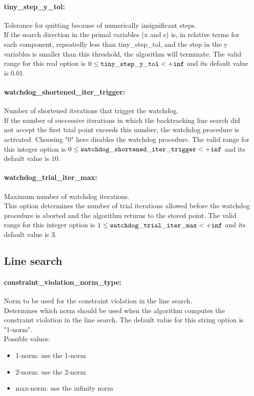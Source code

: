 \paragraph{tiny\_step\_y\_tol:}\label{sec:tiny_step_y_tol} Tolerance for quitting because of numerically insignificant steps. $\;$ \\
 If the search direction in the primal variables
(x and s) is, in relative terms for each
component, repeatedly less than tiny\_step\_tol,
and the step in the y variables is smaller than
this threshold, the algorithm will terminate. The valid range for this real option is 
$0 \le {\tt tiny\_step\_y\_tol } <  {\tt +inf}$
and its default value is $0.01$.


\paragraph{watchdog\_shortened\_iter\_trigger:}\label{sec:watchdog_shortened_iter_trigger} Number of shortened iterations that trigger the watchdog. $\;$ \\
 If the number of successive iterations in which
the backtracking line search did not accept the
first trial point exceeds this number, the
watchdog procedure is activated.  Choosing "0"
here disables the watchdog procedure. The valid range for this integer option is
$0 \le {\tt watchdog\_shortened\_iter\_trigger } <  {\tt +inf}$
and its default value is $10$.


\paragraph{watchdog\_trial\_iter\_max:}\label{sec:watchdog_trial_iter_max} Maximum number of watchdog iterations. $\;$ \\
 This option determines the number of trial
iterations allowed before the watchdog procedure
is aborted and the algorithm returns to the
stored point. The valid range for this integer option is
$1 \le {\tt watchdog\_trial\_iter\_max } <  {\tt +inf}$
and its default value is $3$.


\subsection{Line search}
\label{sec:Line_search}
\paragraph{constraint\_violation\_norm\_type:}\label{sec:constraint_violation_norm_type} Norm to be used for the constraint violation in the line search. $\;$ \\
 Determines which norm should be used when the
algorithm computes the constraint violation in
the line search.
The default value for this string option is "1-norm".
\\ 
Possible values:
\begin{itemize}
   \item 1-norm: use the 1-norm
   \item 2-norm: use the 2-norm
   \item max-norm: use the infinity norm
\end{itemize}

